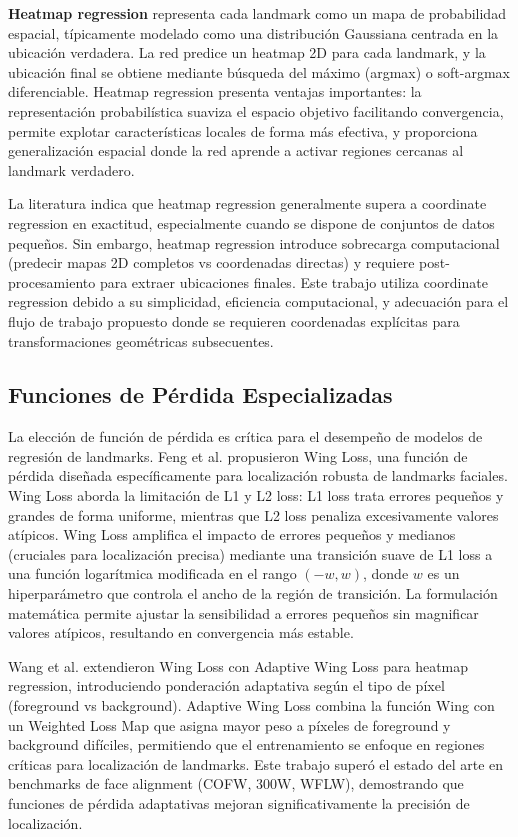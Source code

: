 \textbf{Heatmap regression} representa cada landmark como un mapa de probabilidad espacial, típicamente modelado como una distribución Gaussiana centrada en la ubicación verdadera. La red predice un heatmap 2D para cada landmark, y la ubicación final se obtiene mediante búsqueda del máximo (argmax) o soft-argmax diferenciable. Heatmap regression presenta ventajas importantes: la representación probabilística suaviza el espacio objetivo facilitando convergencia, permite explotar características locales de forma más efectiva, y proporciona generalización espacial donde la red aprende a activar regiones cercanas al landmark verdadero.

La literatura indica que heatmap regression generalmente supera a coordinate regression en exactitud, especialmente cuando se dispone de conjuntos de datos pequeños. Sin embargo, heatmap regression introduce sobrecarga computacional (predecir mapas 2D completos vs coordenadas directas) y requiere post-procesamiento para extraer ubicaciones finales. Este trabajo utiliza coordinate regression debido a su simplicidad, eficiencia computacional, y adecuación para el flujo de trabajo propuesto donde se requieren coordenadas explícitas para transformaciones geométricas subsecuentes.

\subsection{Funciones de Pérdida Especializadas}

La elección de función de pérdida es crítica para el desempeño de modelos de regresión de landmarks. Feng et al. \cite{feng2018wing} propusieron Wing Loss, una función de pérdida diseñada específicamente para localización robusta de landmarks faciales. Wing Loss aborda la limitación de L1 y L2 loss: L1 loss trata errores pequeños y grandes de forma uniforme, mientras que L2 loss penaliza excesivamente valores atípicos. Wing Loss amplifica el impacto de errores pequeños y medianos (cruciales para localización precisa) mediante una transición suave de L1 loss a una función logarítmica modificada en el rango $(-w, w)$, donde $w$ es un hiperparámetro que controla el ancho de la región de transición. La formulación matemática permite ajustar la sensibilidad a errores pequeños sin magnificar valores atípicos, resultando en convergencia más estable.

Wang et al. \cite{wang2019adaptivewing} extendieron Wing Loss con Adaptive Wing Loss para heatmap regression, introduciendo ponderación adaptativa según el tipo de píxel (foreground vs background). Adaptive Wing Loss combina la función Wing con un Weighted Loss Map que asigna mayor peso a píxeles de foreground y background difíciles, permitiendo que el entrenamiento se enfoque en regiones críticas para localización de landmarks. Este trabajo superó el estado del arte en benchmarks de face alignment (COFW, 300W, WFLW), demostrando que funciones de pérdida adaptativas mejoran significativamente la precisión de localización.

